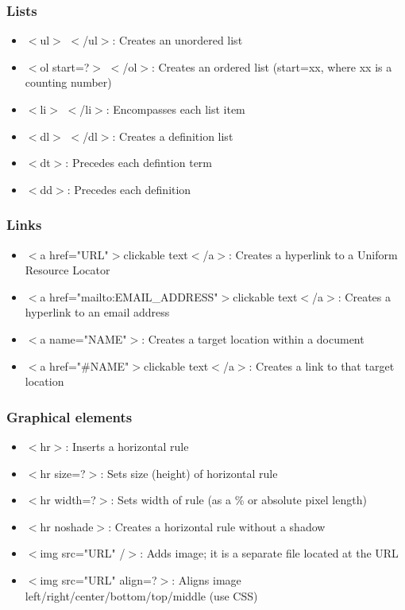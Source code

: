 \documentclass{beamer}
\begin{document}
\begin{frame}
\frametitle{ Lists}
\begin{itemize}
  \item   $<$ul$>$ $<$/ul$>$:  Creates an unordered list
\item $<$ol start=?$>$ $<$/ol$>$:  Creates an ordered list (start=xx,
 where xx is a counting number)
 \item $<$li$>$ $<$/li$>$:  Encompasses each list item
 \item $<$dl$>$ $<$/dl$>$:  Creates a definition list
 \item $<$dt$>$:      Precedes each defintion term
 \item $<$dd$>$:     Precedes each definition
\end{itemize}
\end{frame}
\begin{frame}
\frametitle{ Links}
\begin{itemize}
  \item    $<$a href="URL"$>$clickable text$<$/a$>$: Creates a hyperlink to a Uniform Resource Locator
 \item $<$a href="mailto:EMAIL\_ADDRESS"$>$clickable text$<$/a$>$:
 Creates a hyperlink to an email address
 \item $<$a name="NAME"$>$:  Creates a target location within a document
 \item $<$a href="\#NAME"$>$clickable text$<$/a$>$:  Creates a link to that target location
\end{itemize}
\end{frame}
\begin{frame}
\frametitle{Graphical elements}
\begin{itemize}
  \item   $<$hr$>$:  Inserts a horizontal rule
 \item $<$hr size=?$>$:  Sets size (height) of horizontal rule
 \item $<$hr width=?$>$:  Sets width of rule (as a \% or absolute pixel length)
 \item $<$hr noshade$>$:  Creates a horizontal rule without a shadow
 \item $<$img src="URL" /$>$:  Adds image; it is a separate file located at the URL
 \item $<$img src="URL" align=?$>$:  Aligns image left/right/center/bottom/top/middle (use CSS)
 \end{itemize}
\end{frame}
\end{document}
